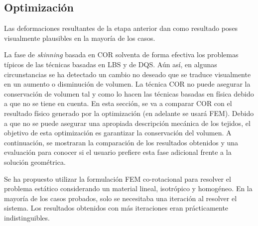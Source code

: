 \subsection{Optimización}
\label{posing:optimizacion}
Las deformaciones resultantes de la etapa anterior dan como resultado poses visualmente plausibles en la mayoría de los casos. 

La fase de \emph{skinning} basada en \ac{COR} solventa de forma efectiva los problemas típicos de las técnicas basadas en \ac{LBS} y de \ac{DQS}. Aún así, en algunas circunstancias se ha detectado un cambio no deseado que se traduce visualmente en un aumento o disminución de volumen. 
La técnica \ac{COR} no puede asegurar la conservación de volumen tal y como lo hacen las técnicas basadas en física debido a que no se tiene en cuenta. En esta sección, se va a comparar \ac{COR} con el resultado físico generado por la optimización (en adelante se usará \acs{FEM}). Debido a que no se puede asegurar una apropiada descripción mecánica de los tejidos, el objetivo de esta optimización es garantizar la conservación del volumen. A continuación, se mostraran la comparación de los resultados obtenidos y una evaluación para conocer si el usuario prefiere esta fase adicional frente a la solución geométrica.


Se ha propuesto utilizar la formulación \ac{FEM} co-rotacional para resolver el problema estático considerando un material lineal, isotrópico y homogéneo. %
En la mayoría de los casos probados, solo se necesitaba una iteración al resolver el sistema. Los resultados obtenidos con más iteraciones eran prácticamente indistinguibles. 
 


